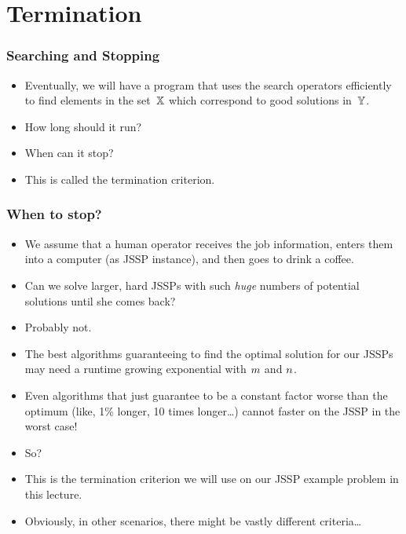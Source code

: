 \documentclass[mathserif]{beamer}%
\begin{document}
\section{Termination}%
%
\begin{frame}%
\frametitle{Searching and Stopping}%
\begin{itemize}%
\item Eventually, we will have a program that uses the search operators efficiently to find elements in the set~$\mathbb{X}$ which correspond to good solutions in~$\mathbb{Y}$.%
\item<2-> How long should it run?%
\item<3-> When can it stop?%
\item<4-> This is called the \alert{termination criterion}.%
\end{itemize}%
\end{frame}%
%
\begin{frame}%
\frametitle{When to stop?}%
\begin{itemize}%
\item We assume that a human operator receives the job information, enters them into a computer (as JSSP instance), and then goes to drink a coffee.%
\item<2-> Can we solve larger, hard JSSPs with such \emph{huge} numbers of potential solutions until she comes back?%
\item<3-> Probably not.%
\item<4-> The best algorithms guaranteeing to find the optimal solution for our JSSPs may need a runtime growing exponential with $m$ and $n$.\cite{LLRKS1993SASAAC,CPW1998AROMSCAAA}
\item<5-> Even algorithms that just guarantee to be a constant factor worse than the optimum (like, 1\% longer, 10 times longer\dots) cannot faster on the JSSP in the worst case!\cite{WHHHLSS1997SSS,JMSO2005ASFJSSPWCPT,MS2011HOAFAJSSP}
\item<6-> So?%
\item<10-> This is the termination criterion we will use on our JSSP example problem in this lecture.%
\item<11-> Obviously, in other scenarios, there might be vastly different criteria\dots%
\end{itemize}%
\end{frame}%
%
\end{document}
